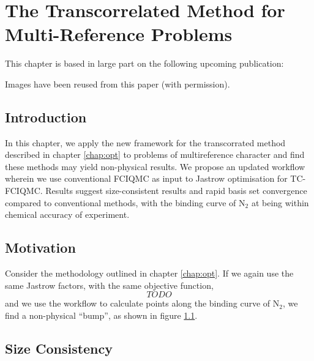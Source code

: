 \chapter{The Transcorrelated Method for Multi-Reference Problems}
  \label{chap:binding}

This chapter is based in large part on the following upcoming publication:\\

Images have been reused from this paper (with permission).

\section{Introduction}

In this chapter, we apply the new framework for the transcorrated method described in chapter \ref{chap:opt} to problems of multireference character and find these methods may yield non-physical results. We propose an updated workflow wherein we use conventional FCIQMC as input to Jastrow optimisation for TC-FCIQMC. Results suggest size-consistent results and rapid basis set convergence compared to conventional methods, with the binding curve of N$_2$ at \avtz being within chemical accuracy of experiment.

\section{Motivation}

Consider the methodology outlined in chapter \ref{chap:opt}. If we again use the same Jastrow factors,
with the same objective function,
\begin{equation}
\label{eq:varref_hf}
TODO
\end{equation}
and we use the workflow to calculate points along the binding curve of N$_2$, we find a non-physical ``bump'', as shown in figure \ref{fig:binding-dip}.

\begin{figure}[htbp]
    \centering

    \caption{}
    \label{fig:binding-dip}
\end{figure}


\section{Size Consistency}

